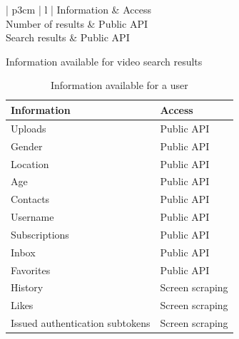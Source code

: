 \begin{table}[ht]
	\begin{minipage}[b]{0.5\linewidth}
	\centering
		\begin{tabular}{ | p{3cm} | l |}\hline
		Information & Access \\ \hline
		Number of results & Public API \\
		Search results & Public API \\ \hline
		\end{tabular}
		\caption{Information available for video search results}
	\end{minipage}
	\hspace{0.5cm} %
	\begin{minipage}[b]{0.5\linewidth}
		\centering
		\begin{tabular}{ | p{3cm} | l |}\hline
			Information & Access\\ \hline
			Uploads & Public API \\
			Gender & Public API \\
			Location & Public API \\
			Age & Public API \\
			Contacts & Public API \\
			Username & Public API \\
			Subscriptions & Public API \\
			Inbox & Public API \\
			Favorites & Public API \\
			History & Screen scraping \\
			Likes & Screen scraping \\
			Issued authentication subtokens & Screen scraping \\ \hline
		\end{tabular}
		\caption{Information available for a user}
	\end{minipage}
\end{table}


